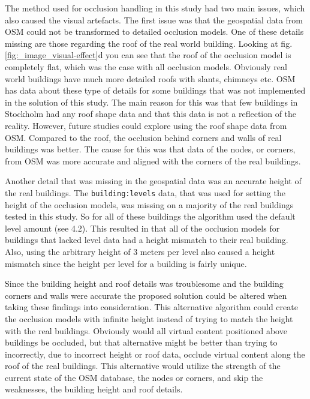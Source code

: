 The method used for occlusion handling in this study had two main issues, which also caused the visual artefacts. The first issue was that the geospatial data from OSM could not be transformed to detailed occlusion models. One of these details missing are those regarding the roof of the real world building. Looking at fig.  \ref{fig:_image_visual-effect}d you can see that the roof of the occlusion model is completely flat, which was the case with all occlusion models. Obviously real world buildings have much more detailed roofs with slants, chimneys etc. OSM has data about these type of details for some buildings \cite{osm3Dbuildings} that was not implemented in the solution of this study. The main reason for this was that few buildings in Stockholm had any roof shape data and that this data is not a reflection of the reality. However, future studies could explore using the roof shape data from OSM. Compared to the roof, the occlusion behind corners and walls of real buildings was better. The cause for this was that data of the nodes, or corners, from OSM was more accurate and aligned with the corners of the real buildings.

Another detail that was missing in the geospatial data was an accurate height of the real buildings. The \texttt{building:levels} data, that was used for setting the height of the occlusion models, was missing on a majority of the real buildings tested in this study. So for all of these buildings the algorithm used the default level amount (see 4.2). This resulted in that all of the occlusion models for buildings that lacked level data had a height mismatch to their real building. Also, using the arbitrary height of 3 meters per level also caused a height mismatch since the height per level for a building is fairly unique. 

Since the building height and roof details was troublesome and the building corners and walls were accurate the proposed solution could be altered when taking these findings into consideration. This alternative algorithm could create the occlusion models with infinite height instead of trying to match the height with the real buildings. Obviously would all virtual content positioned above buildings be occluded, but that alternative might be better than trying to incorrectly, due to incorrect height or roof data, occlude virtual content along the roof of the real buildings. This alternative would utilize the strength of the current state of the OSM database, the nodes or corners, and skip the weaknesses, the building height and roof details. 

